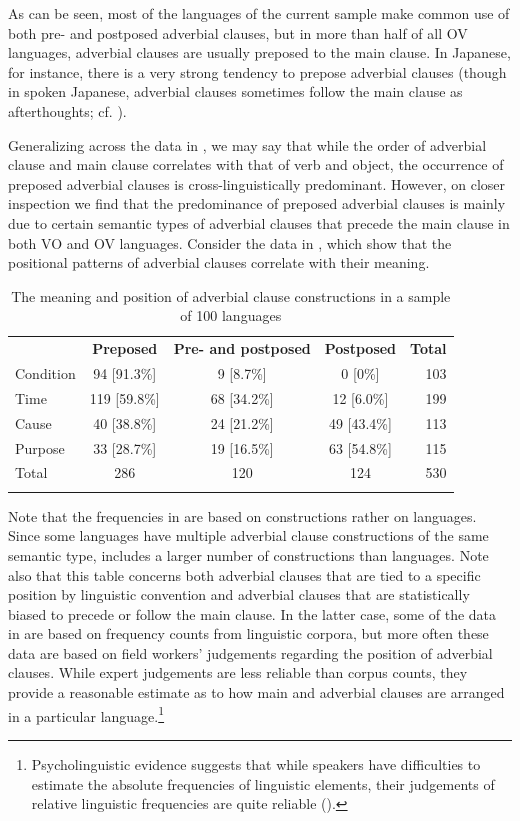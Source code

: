 \documentclass[output=paper]{langsci/langscibook}
\begin{document}
As can be seen, most of the languages of the current sample make common use of both pre- and postposed adverbial clauses, but in more than half of all OV languages, adverbial clauses are usually preposed to the main clause. In Japanese, for instance, there is a very strong tendency to prepose adverbial clauses (though in spoken Japanese, adverbial clauses sometimes follow the main clause as afterthoughts; cf. \citealt{FordMori1994}).

Generalizing across the data in , we may say that while the order of adverbial clause and main clause correlates with that of verb and object, the occurrence of preposed adverbial clauses is cross-linguistically predominant. However, on closer inspection we find that the predominance of preposed adverbial clauses is mainly due to certain semantic types of adverbial clauses that precede the main clause in both VO and OV languages. Consider the data in , which show that the positional patterns of adverbial clauses correlate with their meaning.  

\begin{table}
\begin{tabularx}{\textwidth}{XSSSr} 
\lsptoprule
& \bfseries Preposed & \bfseries Pre- and postposed & \bfseries Postposed & \bfseries Total\\
Condition & 94 [91.3\%] & 9 [8.7\%] & 0 [0\%] & 103\\
Time & 119 [59.8\%] & 68 [34.2\%] & 12 [6.0\%] & 199\\
Cause & 40 [38.8\%] & 24 [21.2\%] & 49 [43.4\%] & 113\\
Purpose & 33 [28.7\%] & 19 [16.5\%] & 63 [54.8\%] & 115\\
Total & 286 & 120 & 124 & 530\\
\lspbottomrule
\end{tabularx}

\caption{The meaning and position of adverbial clause constructions in a sample of 100 languages}
\label{tab:diessel:2}
\end{table}

Note that the frequencies in  are based on constructions rather on languages. Since some languages have multiple adverbial clause constructions of the same semantic type,  includes a larger number of constructions than languages. Note also that this table concerns both adverbial clauses that are tied to a specific position by linguistic convention and adverbial clauses that are statistically biased to precede or follow the main clause. In the latter case, some of the data in  are based on frequency counts from linguistic corpora, but more often these data are based on field workers’ judgements regarding the position of adverbial clauses. While expert judgements are less reliable than corpus counts, they provide a reasonable estimate as to how main and adverbial clauses are arranged in a particular language.\footnote{Psycholinguistic evidence suggests that while speakers have difficulties to estimate the absolute frequencies of linguistic elements, their judgements of relative linguistic frequencies are quite reliable (\citealt{HasherZacks1984}).}
\end{document}
